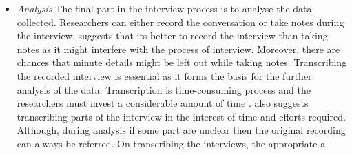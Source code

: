 \begin{itemize}
    \item \textit{Analysis} The final part in the interview process is to analyse the data collected. Researchers can either record the conversation or take notes during the interview. \textcite[253]{britten1995qualitative} suggests that its better to record the interview than taking notes as it might interfere with the process of interview. Moreover, there are chances that minute details might be left out while taking notes. Transcribing the recorded interview is essential as it forms the basis for the further analysis of the data. Transcription is time-consuming process and the researchers must invest a considerable amount of time \autocite[253]{britten1995qualitative}. \textcite[252]{luo2009semistructured} also suggests transcribing parts of the interview in the interest of time and efforts required. Although, during analysis if some part are unclear then the original recording can always be referred. On transcribing the interviews, the appropriate a 
    
\end{itemize}


